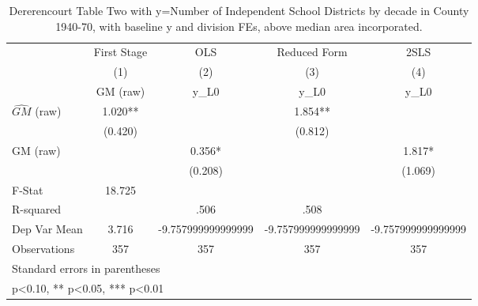 \begin{table}[htbp]\centering
\def\sym#1{\ifmmode^{#1}\else\(^{#1}\)\fi}
\caption{Dererencourt Table Two with y=Number of Independent School Districts by decade in County 1940-70, with baseline y and division FEs, above median area incorporated.}
\begin{tabular}{l*{4}{c}}
\toprule
                    & First Stage   &         OLS   &Reduced Form   &        2SLS   \\
                    &\multicolumn{1}{c}{(1)}&\multicolumn{1}{c}{(2)}&\multicolumn{1}{c}{(3)}&\multicolumn{1}{c}{(4)}\\
                    &\multicolumn{1}{c}{GM  (raw)}&\multicolumn{1}{c}{y\_L0}&\multicolumn{1}{c}{y\_L0}&\multicolumn{1}{c}{y\_L0}\\
\midrule
$\hat{GM}$ (raw)    &       1.020** &               &       1.854** &               \\
                    &     (0.420)   &               &     (0.812)   &               \\
\addlinespace
GM  (raw)           &               &       0.356*  &               &       1.817*  \\
                    &               &     (0.208)   &               &     (1.069)   \\
\midrule
F-Stat              &      18.725   &               &               &               \\
R-squared           &               &        .506   &        .508   &               \\
Dep Var Mean        &       3.716   &-9.757999999999999   &-9.757999999999999   &-9.757999999999999   \\
Observations        &         357   &         357   &         357   &         357   \\
\bottomrule
\multicolumn{5}{l}{\footnotesize Standard errors in parentheses}\\
\multicolumn{5}{l}{\footnotesize * p<0.10, ** p<0.05, *** p<0.01}\\
\end{tabular}
\end{table}
